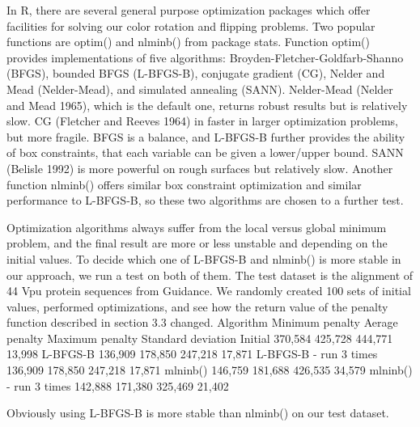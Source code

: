 In R, there are several general purpose optimization packages which offer facilities for solving our color rotation and flipping problems. Two popular functions are optim() and nlminb() from package stats. Function optim() provides implementations of five algorithms: Broyden-Fletcher-Goldfarb-Shanno (BFGS), bounded BFGS (L-BFGS-B), conjugate gradient (CG), Nelder and Mead (Nelder-Mead), and simulated annealing (SANN). Nelder-Mead (Nelder and Mead 1965), which is the default one, returns robust results but is relatively slow. CG (Fletcher and Reeves 1964) in faster in larger optimization problems, but more fragile. BFGS is a balance, and L-BFGS-B further provides the ability of box constraints, that each variable can be given a lower/upper bound. SANN (Belisle 1992) is more powerful on rough surfaces but relatively slow. Another function nlminb() offers similar box constraint optimization and similar performance to L-BFGS-B, so these two algorithms are chosen to a further test.

Optimization algorithms always suffer from the local versus global minimum problem, and the final result are more or less unstable and depending on the initial values. To decide which one of L-BFGS-B and nlminb() is more stable in our approach, we run a test on both of them. The test dataset is the alignment of 44 Vpu protein sequences from Guidance. We randomly created 100 sets of initial values, performed optimizations, and see how the return value of the penalty function described in section 3.3 changed.
Algorithm	Minimum penalty	Aerage penalty	Maximum penalty	Standard deviation
Initial	
370,584
425,728
444,771
13,998
L-BFGS-B	
136,909
178,850
247,218
17,871
L-BFGS-B - run 3 times	
136,909
178,850
247,218
17,871
mlninb()	
146,759
181,688
426,535
34,579
mlninb() - run 3 times	
142,888
171,380
325,469
21,402


Obviously using L-BFGS-B is more stable than nlminb() on our test dataset.



